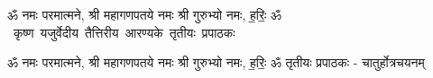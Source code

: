 \documentclass[17pt]{extarticle}
\begin{document}
\begin{titlepage}
    \begin{center}
 
\begin{sanskrit}
    { \Large
    ॐ नमः परमात्मने, श्री महागणपतये नमः
श्री गुरुभ्यो नमः, ह॒रिः॒ ॐ 
    }
    \\
    \vspace{2.5cm}
    \mbox{ \Huge
    कृष्ण यजुर्वेदीय तैत्तिरीय आरण्यके तृतीयः प्रपाठकः   }
\end{sanskrit}
\end{center}

\end{titlepage}
\tableofcontents

ॐ नमः परमात्मने, श्री महागणपतये नमः
श्री गुरुभ्यो नमः, ह॒रिः॒ ॐ      तृतीयः प्रपाठकः - चातुर्होत्रचयनम् \newline

\end{document}
